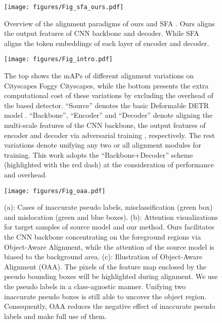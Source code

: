 \documentclass[sigconf]{acmart}
\begin{document}
\begin{figure}[t]
    \centerline{\texttt{[image: figures/Fig\_sfa\_ours.pdf]}}
    \caption{Overview of the alignment paradigms of ours and SFA \cite{wang2021exploring}. Ours aligns the output features of CNN backbone and decoder. While SFA aligns the token embeddings of each layer of encoder and decoder.}
    \label{fig:fig_oaa_sfa}
    \vspace{-6mm}
\end{figure}



\begin{figure*}[t]
    \centerline{\texttt{[image: figures/Fig\_intro.pdf]}} \vspace{-4mm}
    \caption{The top shows the mAPs of different alignment variations on Cityscapes  Foggy Cityscapes, while the bottom presents the extra computational cost of these variations by excluding the overhead of the based detector. ``Source'' denotes the basic Deformable DETR model \cite{zhu2020deformable}. ``Backbone'', ``Encoder'' and ``Decoder'' denote aligning the multi-scale features of the CNN backbone, the output features of encoder and decoder via adversarial training \cite{dann}, respectively. The rest variations denote unifying any two or all alignment modules for training. This work adopts the ``Backbone+Decoder'' scheme (highlighted with the red dash) at the consideration of performance and overhead.}
    \label{fig:fig_intro}
\end{figure*}

\begin{figure}[t]
    \centerline{\texttt{[image: figures/Fig\_oaa.pdf]}}
    \caption{(a): Cases of inaccurate pseudo labels, misclassification (green box) and mislocation (green and blue boxes). (b): Attention visualizations for target samples of source model and our method. Ours facilitates the CNN backbone concentrating on the foreground regions via Object-Aware Alignment, while the attention of the source model is biased to the background area. (c): Illustration of Object-Aware Alignment (OAA). The pixels of the feature map enclosed by the pseudo bounding boxes will be highlighted during alignment. We use the pseudo labels in a class-agnostic manner. Unifying two inaccurate pseudo boxes is still able to uncover the object region. Consequently, OAA reduces the negative effect of inaccurate pseudo labels and make full use of them.}
    \label{fig:fig_oaa}
    \vspace{-4mm}
\end{figure}
\end{document}
